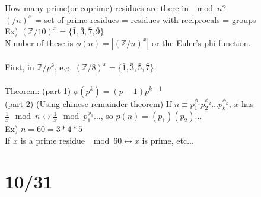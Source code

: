 \documentclass[13pt]{article}
\begin{document}
	How many prime(or coprime) residues are there in $\mod n$?\\
	$(\mathbb/n)^x$ = set of prime residues = residues with reciprocals =
	groups\\
	Ex) $(\mathbb{Z}/10)^x = \{ \bar{1}, \bar{3}, \bar{7}, \bar{9} \}$\\
	Number of these is $\phi(n) = |(\mathbb{Z}/n)^x|$ or the Euler's
	phi function.\\\\
	First, in $\mathbb{Z}/p^k$, e.g. $(\mathbb{Z}/8)^x = \{ \bar{1}, \bar{3},
	\bar{5}, \bar{7}\}$.\\\\
	\underline{Theorem}: (part 1) $\phi(p^k) = (p-1)p^{k-1}$\\
	(part 2) (Using chinese remainder theorem) If $n \equiv p_1^{\phi_1}
	p_2^{\phi_2}\ldots p_k^{\phi_k}$, $x$ has $\frac{1}{x} \mod n
	\leftrightarrow \frac{1}{x} \mod p_1^{\phi_1}\ldots $, so
	$p(n) = (p_1)(p_2) \ldots$\\
	Ex) $n = 60 = 3*4*5$\\
	If $x$ is a prime residue $\mod 60 \leftrightarrow x$ is prime, etc...

\section*{10/31}
\end{document}

